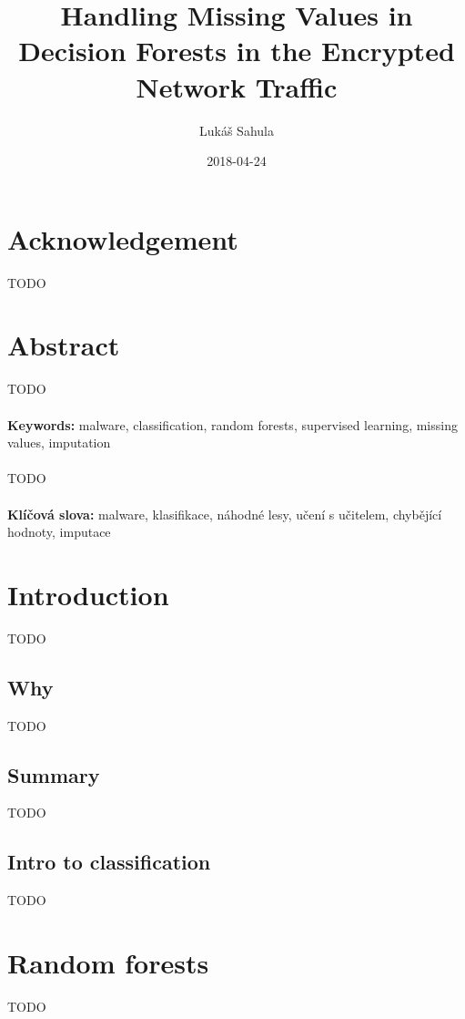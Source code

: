 \documentclass[11pt]{article}
\title{Handling Missing Values in Decision Forests in the Encrypted Network Traffic}
\date{2018-04-24}
\author{Lukáš Sahula}
\begin{document}
  \maketitle
  \newpage
  \section*{Acknowledgement}
    {\color{red}TODO}
  \newpage
  \section*{Abstract}
    {\color{red}TODO}
    \\~\\
    {\bf Keywords:} malware, classification, random forests, supervised learning, missing values, imputation 
    \\~\\
    {\color{red}TODO}
    \\~\\
    {\bf Klíčová slova:} malware, klasifikace, náhodné lesy, učení s učitelem, chybějící hodnoty, imputace 
  \newpage
  \tableofcontents
  \newpage

  \section*{Introduction}
    {\color{red}TODO}
    \subsection{Why}
      {\color{red}TODO}
    \subsection{Summary}
      {\color{red}TODO}
    \subsection{Intro to classification}
      {\color{red}TODO}
  \newpage
  \section{Random forests}
    {\color{red}TODO}
  \newpage
\end{document}
